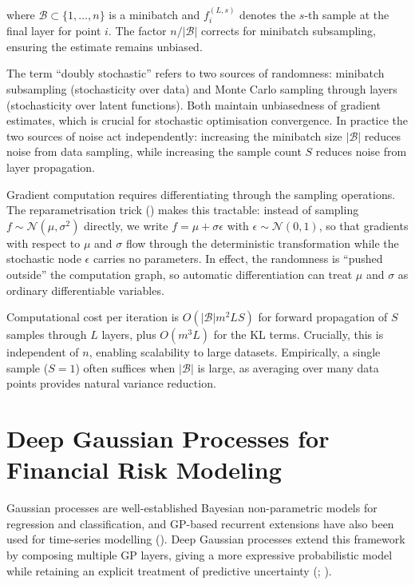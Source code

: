 \documentclass[
  letterpaper,
  DIV=11,
  numbers=noendperiod]{scrartcl}
\begin{document}
where \(\mathcal{B} \subset \{1, \ldots, n\}\) is a minibatch and
\(f_i^{(L,s)}\) denotes the \(s\)-th sample at the final layer for point
\(i\). The factor \(n/|\mathcal{B}|\) corrects for minibatch
subsampling, ensuring the estimate remains unbiased.

The term ``doubly stochastic'' refers to two sources of randomness:
minibatch subsampling (stochasticity over data) and Monte Carlo sampling
through layers (stochasticity over latent functions). Both maintain
unbiasedness of gradient estimates, which is crucial for stochastic
optimisation convergence. In practice the two sources of noise act
independently: increasing the minibatch size \(|\mathcal{B}|\) reduces
noise from data sampling, while increasing the sample count \(S\)
reduces noise from layer propagation.

Gradient computation requires differentiating through the sampling
operations. The reparametrisation trick
()
makes this tractable: instead of sampling
\(f \sim \mathcal{N}(\mu, \sigma^2)\) directly, we write
\(f = \mu + \sigma\epsilon\) with \(\epsilon \sim \mathcal{N}(0,1)\), so
that gradients with respect to \(\mu\) and \(\sigma\) flow through the
deterministic transformation while the stochastic node \(\epsilon\)
carries no parameters. In effect, the randomness is ``pushed outside''
the computation graph, so automatic differentiation can treat \(\mu\)
and \(\sigma\) as ordinary differentiable variables.

Computational cost per iteration is \(O(|\mathcal{B}| m^2 L S)\) for
forward propagation of \(S\) samples through \(L\) layers, plus
\(O(m^3 L)\) for the KL terms. Crucially, this is independent of \(n\),
enabling scalability to large datasets. Empirically, a single sample
(\(S=1\)) often suffices when \(|\mathcal{B}|\) is large, as averaging
over many data points provides natural variance reduction.

\section{Deep Gaussian Processes for Financial Risk
Modeling}\label{deep-gaussian-processes-for-financial-risk-modeling}

Gaussian processes are well-established Bayesian non-parametric models
for regression and classification, and GP-based recurrent extensions
have also been used for time-series modelling
(). Deep
Gaussian processes extend this framework by composing multiple GP
layers, giving a more expressive probabilistic model while retaining an
explicit treatment of predictive uncertainty
(;
).
\end{document}
